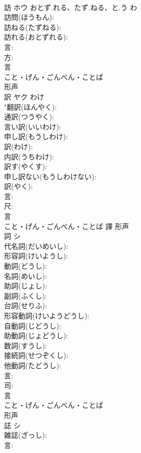 \documentclass[8pt]{extreport}
\begin{document}
\begin{CJK}{UTF8}{min}
\\	訪	ホウ	おとず.れる、たず.ねる、と.う	わ	
\\	訪問(ほうもん): 
\\	訪ねる(たずねる): 
\\	訪れる(おとずれる): 
\\	言: 
\\	方: 
\\	言	
\\	こと・げん・ごんべん・ことば	
\\	形声 
\\	訳	ヤク	わけ		
\\	"翻訳(ほんやく): 
\\	通訳(つうやく): 
\\	言い訳(いいわけ): 
\\	申し訳(もうしわけ): 
\\	訳(わけ): 
\\	内訳(うちわけ): 
\\	訳す(やくす): 
\\	申し訳ない(もうしわけない): 
\\	訳(やく): 
\\	言: 
\\	尺: 
\\	言	
\\	こと・げん・ごんべん・ことば	譯	形声 
\\	詞	シ			
\\	代名詞(だいめいし): 
\\	形容詞(けいようし): 
\\	動詞(どうし): 
\\	名詞(めいし): 
\\	助詞(じょし): 
\\	副詞(ふくし): 
\\	台詞(せりふ): 
\\	形容動詞(けいようどうし): 
\\	自動詞(じどうし): 
\\	助動詞(じょどうし): 
\\	数詞(すうし): 
\\	接続詞(せつぞくし): 
\\	他動詞(たどうし): 
\\	言: 
\\	司: 
\\	言	
\\	こと・げん・ごんべん・ことば	
\\	形声 
\\	誌	シ			
\\	雑誌(ざっし): 
\\	言: 

\end{CJK}
\end{document}

